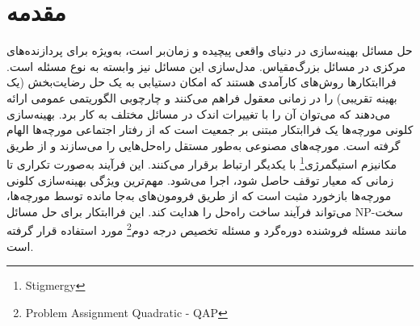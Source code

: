\documentclass[a4paper,10pt]{article}
\begin{document}

    \section{مقدمه}

        حل مسائل بهینه‌سازی در دنیای واقعی پیچیده و زمان‌بر است، به‌ویژه برای پردازنده‌های مرکزی در مسائل بزرگ‌مقیاس. مدل‌سازی این مسائل نیز وابسته به نوع مسئله است. فراابتکارها روش‌های کارآمدی هستند که امکان دستیابی به یک حل رضایت‌بخش (یک بهینه تقریبی) را در زمانی معقول فراهم می‌کنند و چارچوبی الگوریتمی عمومی ارائه می‌دهند که می‌توان آن را با تغییرات اندک در مسائل مختلف به کار برد. بهینه‌سازی کلونی مورچه‌ها یک فراابتکار مبتنی بر جمعیت است که از رفتار اجتماعی مورچه‌ها الهام گرفته است. مورچه‌های مصنوعی به‌طور مستقل راه‌حل‌هایی را می‌سازند و از طریق مکانیزم استیگمرژی\footnote{\hspace{2pt}Stigmergy} با یکدیگر ارتباط برقرار می‌کنند. این فرآیند به‌صورت تکراری تا زمانی که معیار توقف حاصل شود، اجرا می‌شود. مهم‌ترین ویژگی بهینه‌سازی کلونی مورچه‌ها بازخورد مثبت است که از طریق فرومون‌های به‌جا مانده توسط مورچه‌ها، می‌تواند فرآیند ساخت راه‌حل را هدایت کند. این فراابتکار برای حل مسائل NP-سخت مانند مسئله فروشنده دوره‌گرد و مسئله تخصیص درجه دوم\footnote{\hspace{2pt}Problem Assignment Quadratic - QAP} مورد استفاده قرار گرفته است.

        
\end{document}

